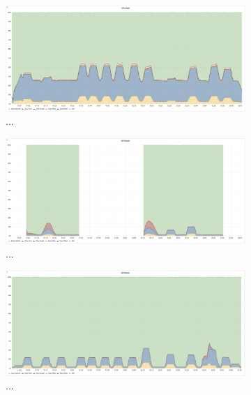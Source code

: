 \begin{figure}[H]
    \begin{subfigure}[h]{0.5\linewidth}
        \centering
        \includegraphics[width=1\linewidth]{other-fig/tests/burst_cpu1.png}
        \caption{...}
    \end{subfigure}
    \hfill
    \begin{subfigure}[h]{0.5\linewidth}
        \centering
        \includegraphics[width=1\linewidth]{other-fig/tests/burst_cpu2.png}
        \caption{...}
    \end{subfigure}
    \begin{subfigure}[h]{0.5\linewidth}
        \centering
        \includegraphics[width=1\linewidth]{other-fig/tests/burst_cpu3.png}
        \caption{...}
    \end{subfigure}
    \hfill
    \begin{subfigure}[h]{0.5\linewidth}

\end{subfigure}
\end{figure}
